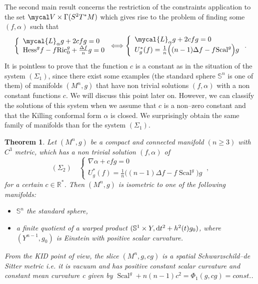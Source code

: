 \documentclass[a4paper,11pt,leqno]{amsart}
\numberwithin{equation}{section}
\theoremstyle{main}
\newtheorem{thm} {\bf  Theorem} [section]
\begin{document}
The second main result concerns the restriction of the constraints application to the set $\mycal V \times \Gamma(S^2 T^*M)$ which gives rise to the problem of finding some $(f,\alpha)$ such that
$$\left\{
\begin{array}{l}
	 \mycal{L}_\alpha g + 2cfg= 0 \\
	 {\operatorname{Hess}}^g f -f {\operatorname{Ric}}^g_0 + \frac{\Delta f}{n} g =0
\end{array}\right. \Longleftrightarrow  
\left\{
\begin{array}{l}
	 \mycal{L}_\alpha g + 2cfg= 0 \\
	 U_g^* (f)=\frac{1}{n}\Big((n-1) \Delta f -f {\operatorname{Scal}}^g\Big) g
\end{array}\right. .$$
It is pointless to prove that the function $c$ is a constant as in the situation of the system $(\Sigma_1)$, since there exist some examples (the standard sphere ${{\mathbb S^{n}}}$ is one of them) of manifolds $(M^n,g)$ that have non trivial solutions $(f,\alpha)$ with a non constant functions $c$. We will discuss this point later on. However, we can classify the solutions of this system when we assume that $c$ is a non--zero constant and that the Killing conformal form $\alpha$ is closed. We surprisingly obtain the same family of manifolds than for the system $(\Sigma_1)$.
\begin{thm}\label{KID2}
Let $(M^n, g)$ be a compact and connected manifold $(n\ge 3)$ with $C^3$ metric, which has a non trivial solution $(f,\alpha)$ of
$$(\Sigma_2)\quad \left\{
\begin{array}{l}
	 \nabla\alpha+ cfg= 0 \\
	 U_g^* (f)=\frac{1}{n}\Big((n-1) \Delta f -f {\operatorname{Scal}}^g\Big) g
\end{array}\right. \ ,$$
for a certain $c\in{{\mathbb R}}^*$. Then $(M^n, g)$ is isometric to one of the following manifolds:
\begin{itemize}
	\item[(i)] ${{\mathbb S^{n}}}$ the standard sphere,
	\item[(ii)] a finite quotient  of a warped product $(\mathbb S^1 \times Y, {{\rm d}} t^2 + h^2 (t)g_0)$, where $(Y^{n-1},g_0)$ is Einstein with positive scalar curvature.
\end{itemize}
From the KID point of view, the slice $(M^n, g, cg)$ is a spatial Schwarzschild--de Sitter metric i.e. it is vacuum and has positive constant scalar curvature and constant mean curvature c given by ${\operatorname{Scal}}^g +n(n-1)c^2= \Phi_1(g,cg)=const.$.
\end{thm}
\end{document}
